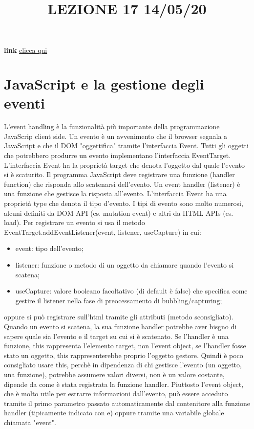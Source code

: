\title{LEZIONE 17 14/05/20}
\textbf{link} \href{https://web.microsoftstream.com/video/57f59578-62d3-46db-8a0c-63b47c342cf3?list=user&userId=cfe0965d-9a7c-40e2-be6e-f078296a1914}{clicca qui}
\section{JavaScript e la gestione degli eventi}
L'event handling è la funzionalità più importante della programmazione JavaScrip client side.\newline
\newline
Un evento è un avvenimento che il browser segnala a JavaScript e che il DOM "oggettifica" tramite l'interfaccia Event. Tutti gli oggetti che potrebbero produrre un evento implementano l'interfaccia EventTarget. L'interfaccia Event ha la proprietà target che denota l'oggetto dal quale l'evento si è scaturito.\newline
\newline
Il programma JavaScript deve registrare una funzione (handler function) che risponda allo scatenarsi dell'evento. Un event handler (listener) è una funzione che gestisce la risposta all'evento.\newline
\newline
L'interfaccia Event ha una proprietà type che denota il tipo d'evento. I tipi di evento sono molto numerosi, alcuni definiti da DOM API (es. mutation event) e altri da HTML APIs (es. load).\newline
\newline
Per registrare un evento si usa il metodo EventTarget.addEventListener(event, listener, useCapture) in cui:
\begin{itemize}
    \item event: tipo dell'evento;
    \item listener: funzione o metodo di un oggetto da chiamare quando l'evento si scatena;
    \item useCapture: valore booleano facoltativo (di default è false) che specifica come gestire il listener nella fase di preocessamento di bubbling/capturing;
\end{itemize}
oppure si può registrare sull'html tramite gli attributi (metodo sconsigliato).
\newline
\newline
Quando un evento si scatena, la sua funzione handler potrebbe aver bisgno di sapere quale sia l'evento e il target su cui si è scatenato. Se l'handler è una funzione, this rappresenta l'elemento target, non l'event object, se l'handler fosse stato un oggetto, this rappresenterebbe proprio l'oggetto gestore. Quindi è poco consigliato usare this, perchè in dipendenza di chi gestisce l'evento (un oggetto, una funzione), potrebbe assumere valori diversi, non è un valore costante, dipende da come è stata registrata la funzione handler. Piuttosto l'event object, che è molto utile per estrarre informazioni dall'evento, può essere acceduto tramite il primo parametro passato automaticamente dal contenitore alla funzione handler (tipicamente indicato con e) oppure tramite una variabile globale chiamata "event".\newline

